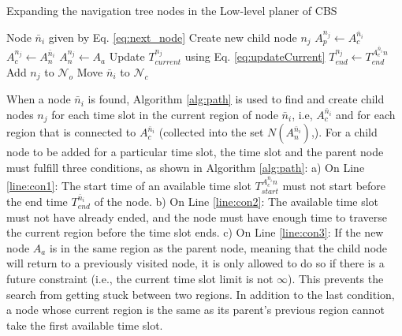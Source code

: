 \documentclass[letterpaper, 10 pt, conference]{ieeeconf}  %
\begin{document}
\begin{algorithm}[h]
\caption{Expanding the navigation tree nodes in the Low-level planer of CBS}
\label{alg:path}
\begin{algorithmic}[1]
\Require Node $\bar{n}_i$ given by Eq. \eqref{eq:next_node} 
 \label{line:pathSearch}
     \label{line:con1}
        \State {}
    \EndIf
     \label{line:con2}
        \State {}
    \EndIf
     \label{line:con3}
        \State {}
        \State {}
    \EndIf
    \State Create new child node $n_j$
    \State $A_p^{n_{j}} \leftarrow A_c^{\bar{n}_{i}}$
    \State $A_c^{n_{j}} \leftarrow A_n^{\bar{n}_{i}}$
    \State $A_n^{n_{j}} \leftarrow A_a$
    \State Update $T_{current}^{n_{j}}$ using Eq. \eqref{eq:updateCurrent}
    \State $T_{end}^{n_{j}} \leftarrow T_{end}^{A_c^{\bar{n}_{i}}n}$
    \State Add $n_{j}$ to $\mathcal{N}_o$
\EndFor
\State Move $\bar{n}_{i}$ to $\mathcal{N}_c$
\end{algorithmic}
\end{algorithm}
When a node $\bar{n}_i$ is found, Algorithm \ref{alg:path} is used to find and create child nodes $n_{j}$ for each time slot in the current region of node $\bar{n}_i$, i.e, $A_c^{\bar{n}_{i}}$ and for each region that is connected to $A_c^{\bar{n}_i}$ (collected into the set $N(A_{n}^{\bar{n}_i})$,). For a child node to be added for a particular time slot, the time slot and the parent node must fulfill three conditions, as shown in Algorithm \ref{alg:path}: a) On Line \ref{line:con1}: The start time of an available time slot $T_{start}^{A_c^{\bar{n}_{i}}n}$ must not start before the end time $T_{end}^{\bar{n}_{i}}$ of the node.
b) On Line \ref{line:con2}: The available time slot must not have already ended, and the node must have enough time to traverse the current region before the time slot ends. c) On Line \ref{line:con3}: If the new node $A_a$ is in the same region as the parent node, meaning that the child node will return to a previously visited node, it is only allowed to do so if there is a future constraint (i.e., the current time slot limit is not $\infty$). This prevents the search from getting stuck between two regions.
In addition to the last condition, a node whose current region is the same as its parent's previous region cannot take the first available time slot.
\end{document}

